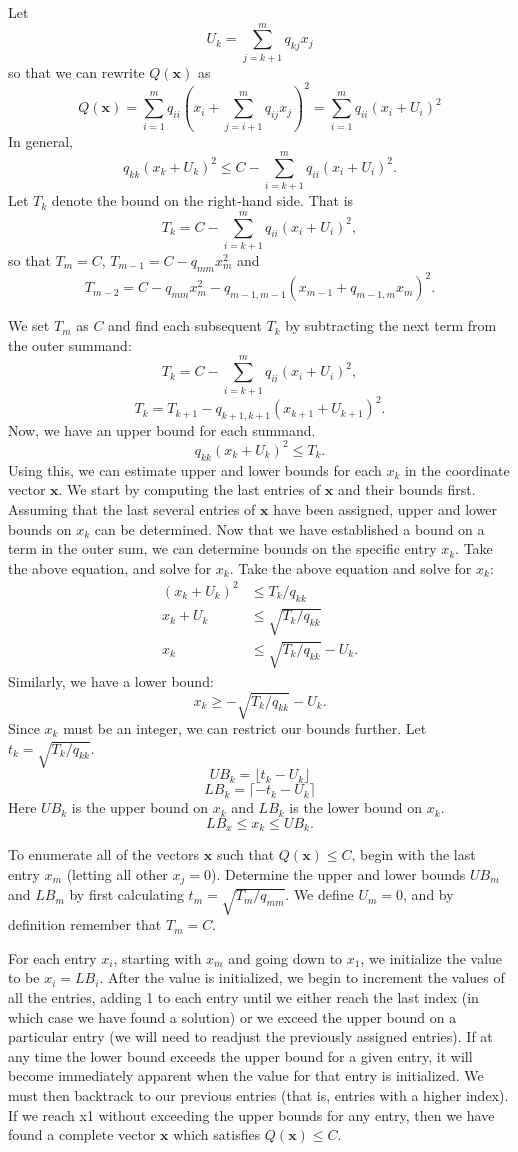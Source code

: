 Let
\[U_k = \sum_{j = k+1}^m q_{kj}x_j\]
so that we can rewrite $Q(\mathbf{x})$ as 
\[Q(\mathbf{x}) = \sum_{i=1}^m q_{ii}\left( x_i + \sum_{j=i+1}^m q_{ij}x_j\right)^2 = \sum_{i=1}^m q_{ii}\left( x_i + U_i\right)^2\]
In general, 
\[q_{kk}(x_k + U_k)^2 \leq C - \sum_{i = k+1}^m q_{ii}(x_i + U_i)^2.\]
Let $T_k$ denote the bound on the right-hand side. That is
\[T_k = C - \sum_{i = k+1}^m q_{ii}(x_i + U_i)^2,\]
so that $T_m = C$, $T_{m-1} = C - q_{mm}x_m^2$ and 
\[T_{m-2} = C - q_{mm}x_m^2 - q_{m-1, m-1}\left(x_{m-1} + q_{m-1,m}x_m\right)^2.\]

We set $T_m$ as $C$ and find each subsequent $T_k$ by subtracting the next term from the outer summand:
\[T_k = C - \sum_{i = k+1}^m q_{ii}(x_i + U_i)^2,\]
\[T_k = T_{k+1} - q_{k+1,k+1}(x_{k+1} + U_{k+1})^2.\]
Now, we have an upper bound for each summand. 
\[q_{kk}(x_k + U_k)^2 \leq T_k.\]
Using this, we can estimate upper and lower bounds for each $x_k$ in the coordinate vector $\mathbf{x}$. We start by computing the last entries of $\mathbf{x}$ and their bounds first. Assuming that the last several entries of $\mathbf{x}$ have been assigned, upper and lower bounds on $x_k$ can be determined. Now that we have established a bound on a term in the outer sum, we can determine bounds on the specific entry $x_k$. Take the above equation, and solve for $x_k$. Take the above equation and solve for $x_k$:
\begin{align*}
(x_k + U_k)^2	& \leq T_k/q_{kk}\\
	x_k + U_k	& \leq \sqrt{T_k/q_{kk}}\\
	x_k 		& \leq \sqrt{T_k/q_{kk}} - U_k.
\end{align*}
Similarly, we have a lower bound:
\[x_k \geq - \sqrt{T_k/q_{kk}} - U_k.\]
Since $x_k$ must be an integer, we can restrict our bounds further. Let $t_k = \sqrt{T_k/q_{kk}}$. 
\[UB_k = \lfloor t_k - U_k \rfloor\]
\[LB_k = \lceil-t_k - U_k\rceil\]
Here $UB_k$ is the upper bound on $x_k$ and $LB_k$ is the lower bound on $x_k$. 
\[LB_x \leq x_k \leq UB_k.\]

To enumerate all of the vectors $\mathbf{x}$ such that $Q(\mathbf{x}) \leq C$, begin with the last entry $x_m$ (letting all other $x_j = 0$). Determine the upper and lower bounds $UB_m$ and $LB_m$ by first calculating $t_m = \sqrt{T_m/q_{mm}}$. We define $U_m = 0$, and by definition remember that $T_m = C$.

For each entry $x_i$, starting with $x_m$ and going down to $x_1$, we initialize the value to be $x_i = LB_i$. After the value is initialized, we begin to increment the values of all the entries, adding 1 to each entry until we either reach the last index (in which case we have found a solution) or we exceed the upper bound on a particular entry (we will need to readjust the previously assigned entries). If at any time the lower bound exceeds the upper bound for a given entry, it will become immediately apparent when the value for that entry is initialized. We must then backtrack to our previous entries (that is, entries with a higher index). If we reach x1 without exceeding the upper bounds for any entry, then we have found a complete vector $\mathbf{x}$ which satisfies $Q(\mathbf{x}) \leq C$.

